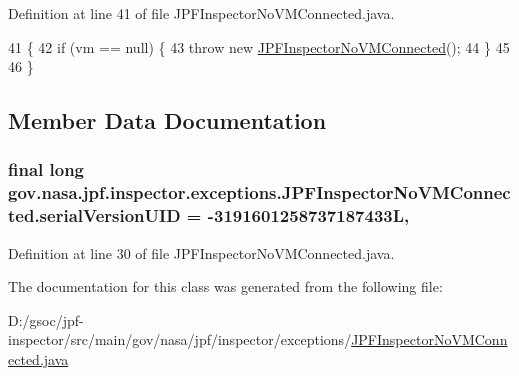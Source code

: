 Definition at line 41 of file J\+P\+F\+Inspector\+No\+V\+M\+Connected.\+java.


\begin{DoxyCode}
41                                                                       \{
42     \textcolor{keywordflow}{if} (vm == null) \{
43       \textcolor{keywordflow}{throw} \textcolor{keyword}{new} \hyperlink{classgov_1_1nasa_1_1jpf_1_1inspector_1_1exceptions_1_1_j_p_f_inspector_no_v_m_connected_a65417fb5675d3d20e566b2ca6e1b10b8}{JPFInspectorNoVMConnected}();
44     \}
45 
46   \}
\end{DoxyCode}


\subsection{Member Data Documentation}
\subsubsection[{\texorpdfstring{serial\+Version\+U\+ID}{serialVersionUID}}]{\setlength{\rightskip}{0pt plus 5cm}final long gov.\+nasa.\+jpf.\+inspector.\+exceptions.\+J\+P\+F\+Inspector\+No\+V\+M\+Connected.\+serial\+Version\+U\+ID = -\/3191601258737187433L\hspace{0.3cm}{\ttfamily [static]}, {\ttfamily [private]}}\hypertarget{classgov_1_1nasa_1_1jpf_1_1inspector_1_1exceptions_1_1_j_p_f_inspector_no_v_m_connected_ad5d62939c120d37ce96eb7ae2f28d6c9}{}\label{classgov_1_1nasa_1_1jpf_1_1inspector_1_1exceptions_1_1_j_p_f_inspector_no_v_m_connected_ad5d62939c120d37ce96eb7ae2f28d6c9}


Definition at line 30 of file J\+P\+F\+Inspector\+No\+V\+M\+Connected.\+java.



The documentation for this class was generated from the following file\+:\begin{DoxyCompactItemize}
\item 
D\+:/gsoc/jpf-\/inspector/src/main/gov/nasa/jpf/inspector/exceptions/\hyperlink{_j_p_f_inspector_no_v_m_connected_8java}{J\+P\+F\+Inspector\+No\+V\+M\+Connected.\+java}\end{DoxyCompactItemize}
